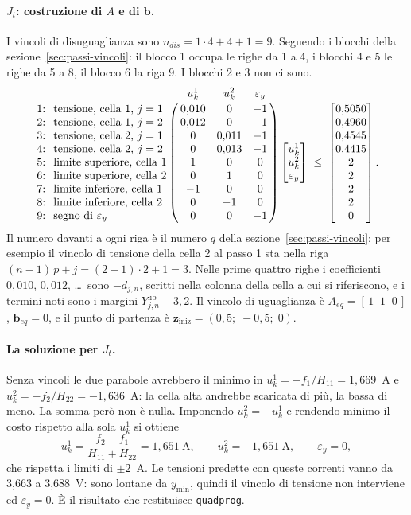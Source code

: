 \documentclass[11pt,a4paper]{article}
\newcommand{\vett}[1]{\boldsymbol{#1}}      %
\newcommand{\lib}{\mathrm{lib}}             %
\begin{document}
\paragraph{$J_t$: costruzione di $A$ e di $\vett{b}$.} I vincoli di disuguaglianza
sono $n_{dis} = 1 \cdot 4 + 4 + 1 = 9$. Seguendo i blocchi della
sezione~\ref{sec:passi-vincoli}: il blocco 1 occupa le righe da 1 a 4, i
blocchi 4 e 5 le righe da 5 a 8, il blocco 6 la riga 9. I blocchi 2 e 3 non ci
sono.
\[
  \bordermatrix{
      & u^1_k & u^2_k & \varepsilon_y \cr
    \text{1:\; tensione, cella 1, } j = 1 & 0{,}010 & 0 & -1 \cr
    \text{2:\; tensione, cella 1, } j = 2 & 0{,}012 & 0 & -1 \cr
    \text{3:\; tensione, cella 2, } j = 1 & 0 & 0{,}011 & -1 \cr
    \text{4:\; tensione, cella 2, } j = 2 & 0 & 0{,}013 & -1 \cr
    \text{5:\; limite superiore, cella 1} & 1 & 0 & 0 \cr
    \text{6:\; limite superiore, cella 2} & 0 & 1 & 0 \cr
    \text{7:\; limite inferiore, cella 1} & -1 & 0 & 0 \cr
    \text{8:\; limite inferiore, cella 2} & 0 & -1 & 0 \cr
    \text{9:\; segno di } \varepsilon_y & 0 & 0 & -1 \cr
  }
  \begin{bmatrix} u^1_k \\ u^2_k \\ \varepsilon_y \end{bmatrix}
  \;\le\;
  \begin{bmatrix}
    0{,}5050 \\ 0{,}4960 \\ 0{,}4545 \\ 0{,}4415 \\ 2 \\ 2 \\ 2 \\ 2 \\ 0
  \end{bmatrix} .
\]
Il numero davanti a ogni riga è il numero $q$ della
sezione~\ref{sec:passi-vincoli}: per esempio il vincolo di tensione della
cella 2 al passo 1 sta nella riga $(n-1)\,p + j = (2-1) \cdot 2 + 1 = 3$. Nelle
prime quattro righe i coefficienti $0{,}010$, $0{,}012$, \dots\ sono
$-d_{j,n}$, scritti nella colonna della cella a cui si riferiscono, e i termini
noti sono i margini $Y^\lib_{j,n} - 3{,}2$. Il vincolo di uguaglianza è
$A_{eq} = [\,1 \;\; 1 \;\; 0\,]$, $\vett{b}_{eq} = 0$, e il punto di partenza è
$\vett{z}_{\mathrm{iniz}} = (0{,}5;\; -0{,}5;\; 0)$.

\paragraph{La soluzione per $J_t$.} Senza vincoli le due parabole avrebbero il
minimo in $u^1_k = -f_1/H_{11} = 1{,}669$~A e $u^2_k = -f_2/H_{22} = -1{,}636$~A:
la cella alta andrebbe scaricata di più, la bassa di meno. La somma però non
è nulla. Imponendo $u^2_k = -u^1_k$ e rendendo minimo il costo rispetto alla sola
$u^1_k$ si ottiene
\[
  u^1_k = \frac{f_2 - f_1}{H_{11} + H_{22}} = 1{,}651~\text{A} , \qquad
  u^2_k = -1{,}651~\text{A} , \qquad \varepsilon_y = 0 ,
\]
che rispetta i limiti di $\pm 2$~A. Le tensioni predette con queste correnti
vanno da 3,663 a 3,688~V: sono lontane da $y_{\min}$, quindi il vincolo di
tensione non interviene ed $\varepsilon_y = 0$. È il risultato che restituisce
\texttt{quadprog}.
\end{document}
